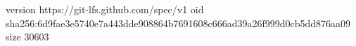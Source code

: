 version https://git-lfs.github.com/spec/v1
oid sha256:6d9fae3e5740e7a443dde908864b7691608c666ad39a26f999d0cb5dd876aa09
size 30603
